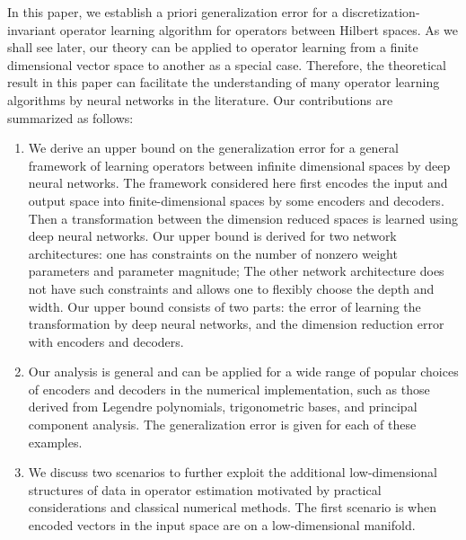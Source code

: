 \documentclass[11pt]{article} %
\begin{document}
In this paper, we establish a priori generalization error for a discretization-invariant operator learning algorithm for operators between Hilbert spaces. As we shall see later, our theory can be applied to operator learning from a finite dimensional vector space to another as a special case. Therefore, the theoretical result in this paper can facilitate the understanding of many operator learning algorithms by neural networks in the literature. 
%
Our contributions are summarized as follows:
\begin{enumerate}
	\item We derive an upper bound on the generalization error for a general framework of learning operators between infinite dimensional spaces by deep neural networks. The framework considered here first encodes the input and output space into finite-dimensional spaces by some encoders and decoders. Then a transformation between the dimension reduced spaces is learned using deep neural networks. Our upper bound is derived for two network architectures: one has constraints on the number of nonzero weight parameters and parameter magnitude; The other network architecture does not have such constraints and allows one to flexibly choose the depth and width. Our upper bound consists of two parts: the error of learning the transformation by deep neural networks, and the dimension reduction error with encoders and decoders. %
	\item Our analysis is general and can be applied for a wide range of popular choices of encoders and decoders in the numerical implementation, such as those derived from Legendre polynomials, trigonometric bases, and principal component analysis. The generalization error is given for each of these examples.
	\item We discuss two scenarios to further exploit the additional low-dimensional structures of data in operator estimation motivated by practical considerations and classical numerical methods. The first scenario is when encoded vectors in the input space are on a low-dimensional manifold. %

\end{enumerate}
\end{document}
